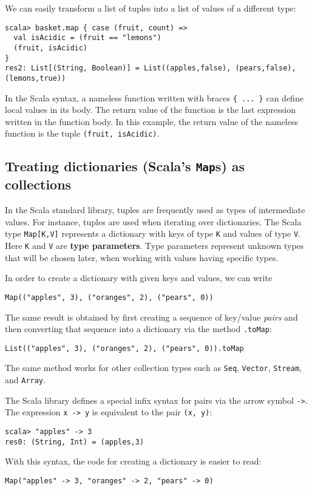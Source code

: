 We can easily transform a list of tuples into a list of values of
a different type:
\begin{lstlisting}
scala> basket.map { case (fruit, count) =>
  val isAcidic = (fruit == "lemons")
  (fruit, isAcidic)
}
res2: List[(String, Boolean)] = List((apples,false), (pears,false), (lemons,true)) 
\end{lstlisting}
In the Scala syntax, a nameless function written with braces \lstinline!{ ... }!
can define local values in its body. The return value of the function
is the last expression written in the function body. In this example,
the return value of the nameless function is the tuple \lstinline!(fruit, isAcidic)!.

\subsection{Treating dictionaries (Scala's \texttt{Map}s) as collections}

In the Scala standard library, tuples are frequently used as types
of intermediate values. For instance, tuples are used when iterating
over dictionaries. The Scala type \lstinline!Map[K,V]! represents
a dictionary with keys of type \lstinline!K! and values of type \lstinline!V!.
Here \lstinline!K! and \lstinline!V! are \textbf{type parameters}.
Type parameters represent unknown types that will be chosen later,
when working with values having specific types.

In order to create a dictionary with given keys and values, we can
write
\begin{lstlisting}
Map(("apples", 3), ("oranges", 2), ("pears", 0))
\end{lstlisting}
The same result is obtained by first creating a sequence of key/value
\emph{pairs} and then converting that sequence into a dictionary via
the method \lstinline!.toMap!:
\begin{lstlisting}
List(("apples", 3), ("oranges", 2), ("pears", 0)).toMap
\end{lstlisting}
The same method works for other collection types such as \lstinline!Seq!,
\lstinline!Vector!, \lstinline!Stream!, and \lstinline!Array!. 

The Scala library defines a special infix syntax for pairs via the
arrow symbol \lstinline!->!. The expression \lstinline!x -> y! is
equivalent to the pair \lstinline!(x, y)!:
\begin{lstlisting}
scala> "apples" -> 3
res0: (String, Int) = (apples,3)
\end{lstlisting}
With this syntax, the code for creating a dictionary is easier to
read:
\begin{lstlisting}
Map("apples" -> 3, "oranges" -> 2, "pears" -> 0)
\end{lstlisting}

